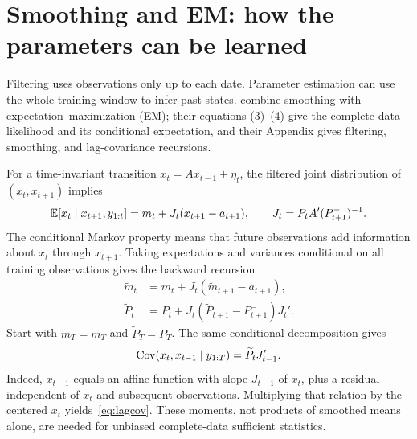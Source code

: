 \section{Smoothing and EM: how the parameters can be learned}
\label{sec:em}
Filtering uses observations only up to each date. Parameter estimation can use the whole training window to infer past states. \citet{shumway1982} combine smoothing with expectation--maximization (EM); their equations (3)--(4) give the complete-data likelihood and its conditional expectation, and their Appendix gives filtering, smoothing, and lag-covariance recursions.

For a time-invariant transition $x_t=Ax_{t-1}+\eta_t$, the filtered joint distribution of $(x_t,x_{t+1})$ implies
\begin{equation}
\mathbb E[x_t\mid x_{t+1},y_{1:t}]
 =m_t+J_t(x_{t+1}-a_{t+1}),\qquad
J_t=P_tA'(P_{t+1}^-)^{-1}.
\end{equation}
The conditional Markov property means that future observations add information about $x_t$ through $x_{t+1}$. Taking expectations and variances conditional on all training observations gives the backward recursion
\begin{align}
\widetilde m_t&=m_t+J_t(\widetilde m_{t+1}-a_{t+1}),\\
\widetilde P_t&=P_t+J_t(\widetilde P_{t+1}-P_{t+1}^-)J_t'.
\label{eq:smoothing}
\end{align}
Start with $\widetilde m_T=m_T$ and $\widetilde P_T=P_T$. The same conditional decomposition gives
\begin{equation}
\operatorname{Cov}(x_t,x_{t-1}\mid y_{1:T})=\widetilde P_tJ_{t-1}'.
\label{eq:lagcov}
\end{equation}
Indeed, $x_{t-1}$ equals an affine function with slope $J_{t-1}$ of $x_t$, plus a residual independent of $x_t$ and subsequent observations. Multiplying that relation by the centered $x_t$ yields~\eqref{eq:lagcov}. These moments, not products of smoothed means alone, are needed for unbiased complete-data sufficient statistics.

